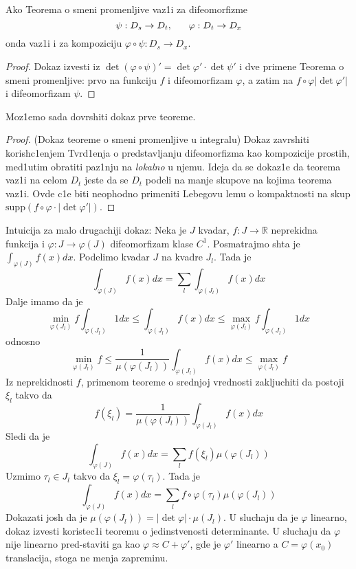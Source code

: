 \documentclass[a4paper,12pt]{article}
\newcommand{\RR}{\mathbb{R}}
\begin{document}
\begin{lema}
Ako Teorema o smeni promenljive vaz1i za difeomorfizme 
\[\psi: D_s \to D_t, \hspace{0.6cm} \varphi : D_t \to D_x\]
onda vaz1i i za kompoziciju $\varphi \circ \psi : D_s \to D_x$.
\end{lema}
\begin{proof}
Dokaz izvesti iz $\det(\varphi \circ \psi)' = \det \varphi ' \cdot \det \psi '$ i dve primene Teorema o smeni promenljive: prvo na funkciju $f$ i di\-fe\-o\-mor\-fi\-zam $\varphi$, a zatim na $f \circ \varphi | \det \varphi '|$ i di\-fe\-o\-mor\-fi\-zam $\psi$.
\end{proof}
\noindent
Moz1emo sada dovrshiti dokaz prve teoreme.

\begin{proof}(Dokaz teoreme o smeni promenljive u integralu)
Dokaz zavrshiti korish\-c1enjem Tvrd1enja o predstavljanju difeomorfizma kao kompozicije prostih, med1utim obratiti paz1nju na \textit{lokalno} u njemu. Ideja da se dokaz1e da teorema vaz1i na celom $D_t$ jeste da se $D_t$ podeli na manje skupove na kojima teorema vaz1i.
Ovde c1e biti neophodno primeniti Lebegovu lemu o kompaktnosti na skup \( \mathrm{supp} (f\circ \varphi \cdot |\det \varphi'|) \).
\end{proof}

\begin{nap}
Intuicija za malo drugachiji dokaz:
Neka je $J$ kvadar, $f: J \to \RR$ neprekidna funkcija i $\varphi: J \to \varphi(J)$ difeomorfizam klase $C^1$. Posmatrajmo shta je $\int_{\varphi(J)} f(x) dx$. Podelimo kvadar $J$ na kvadre $J_l$. Tada je \[\int_{\varphi(J)} f(x) dx = \sum_l \int_{\varphi(J_l)} f(x) dx\]
Dalje imamo da je
\[\min_{\varphi(J_l)} f \int_{\varphi(J_l)} 1 dx \leq \int_{\varphi(J_l)} f(x) dx \leq \max_{\varphi(J_l)} f \int_{\varphi(J_l)} 1 dx\]
odnosno
\[\min_{\varphi(J_l)} f \leq \frac{1}{\mu(\varphi(J_l))}\int_{\varphi(J_l)} f(x) dx \leq \max_{\varphi(J_l)} f \]
Iz neprekidnosti $f$, primenom teoreme o srednjoj vrednosti zakljuchiti da postoji $\xi_l$ takvo da
\[f(\xi_l) =\frac{1}{\mu(\varphi(J_l))}\int_{\varphi(J_l)} f(x) dx\]
Sledi da je \[\int_{\varphi(J)} f(x) dx = \sum_l f(\xi_l) \mu(\varphi(J_l))\]
 Uzmimo $\tau_l \in J_l$ takvo da $\xi_l = \varphi(\tau_l)$. Tada je
\[\int_{\varphi(J)} f(x) dx = \sum_l f \circ \varphi(\tau_l) \mu(\varphi(J_l))\]
Dokazati josh da je $\mu(\varphi(J_l)) = |\det \varphi| \cdot \mu(J_l)$. U sluchaju da je $\varphi$ linearno, dokaz izvesti koristec1i teoremu o jedinstvenosti determinante. U sluchaju da $\varphi$ nije linearno pred-staviti ga kao $\varphi \approx C + \varphi '$, gde je $\varphi '$ linearno a $C = \varphi(x_0)$ translacija, stoga ne menja zapreminu.
\end{nap}
\end{document}
